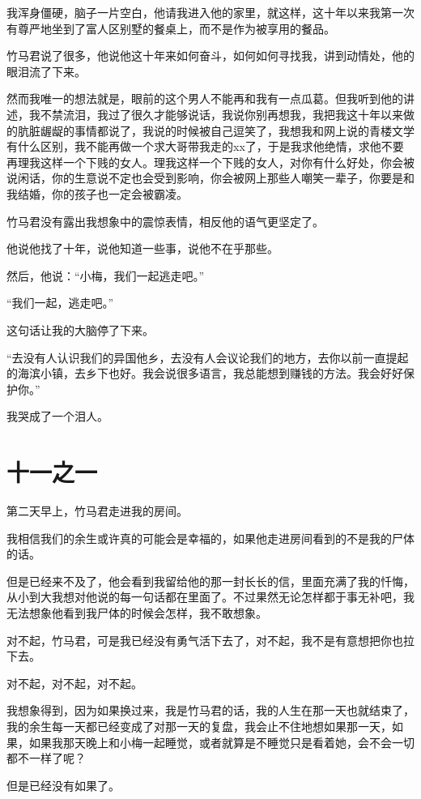 \documentclass[12pt, a4paper]{ctexart}
\begin{document}
我浑身僵硬，脑子一片空白，他请我进入他的家里，就这样，这十年以来我第一次有尊严地坐到了富人区别墅的餐桌上，而不是作为被享用的餐品。

竹马君说了很多，他说他这十年来如何奋斗，如何如何寻找我，讲到动情处，他的眼泪流了下来。

然而我唯一的想法就是，眼前的这个男人不能再和我有一点瓜葛。但我听到他的讲述，我不禁流泪，我过了很久才能够说话，我说你别再想我，我把我这十年以来做的肮脏龌龊的事情都说了，我说的时候被自己逗笑了，我想我和网上说的青楼文学有什么区别，我不能再做一个求大哥带我走的xx了，于是我求他绝情，求他不要再理我这样一个下贱的女人。理我这样一个下贱的女人，对你有什么好处，你会被说闲话，你的生意说不定也会受到影响，你会被网上那些人嘲笑一辈子，你要是和我结婚，你的孩子也一定会被霸凌。

竹马君没有露出我想象中的震惊表情，相反他的语气更坚定了。

他说他找了十年，说他知道一些事，说他不在乎那些。

然后，他说：“小梅，我们一起逃走吧。”

“我们一起，逃走吧。”

这句话让我的大脑停了下来。

“去没有人认识我们的异国他乡，去没有人会议论我们的地方，去你以前一直提起的海滨小镇，去乡下也好。我会说很多语言，我总能想到赚钱的方法。我会好好保护你。”

我哭成了一个泪人。

\section*{十一之一}

第二天早上，竹马君走进我的房间。

我相信我们的余生或许真的可能会是幸福的，如果他走进房间看到的不是我的尸体的话。

但是已经来不及了，他会看到我留给他的那一封长长的信，里面充满了我的忏悔，从小到大我想对他说的每一句话都在里面了。不过果然无论怎样都于事无补吧，我无法想象他看到我尸体的时候会怎样，我不敢想象。

对不起，竹马君，可是我已经没有勇气活下去了，对不起，我不是有意想把你也拉下去。

对不起，对不起，对不起。

我想象得到，因为如果换过来，我是竹马君的话，我的人生在那一天也就结束了，我的余生每一天都已经变成了对那一天的复盘，我会止不住地想如果那一天，如果，如果我那天晚上和小梅一起睡觉，或者就算是不睡觉只是看着她，会不会一切都不一样了呢？

但是已经没有如果了。
\end{document}
